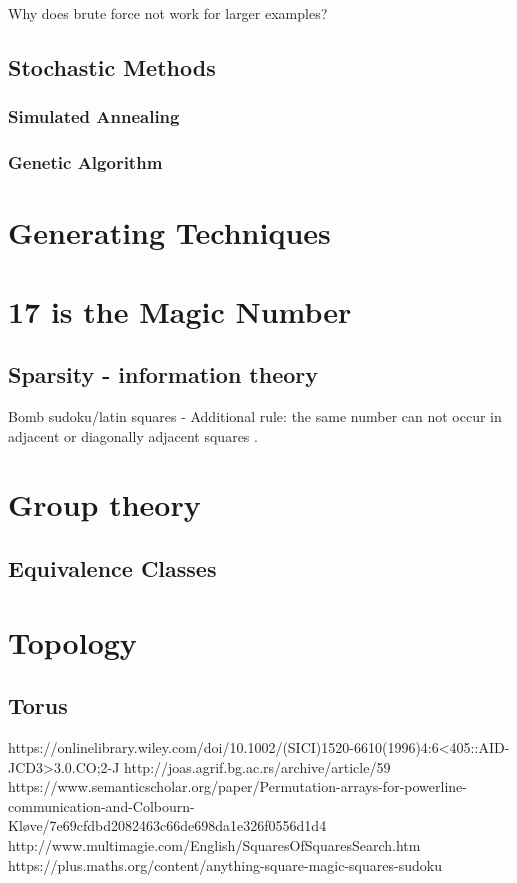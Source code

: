 \documentclass[a4paper,12pt]{article}
\begin{document}
		Why does brute force not work for larger examples?

	\subsection{Stochastic Methods}
		\subsubsection{Simulated Annealing}
		\subsubsection{Genetic Algorithm}
\section{Generating  Techniques}
\section{17 is the Magic Number}
	\subsection{Sparsity - information theory}
		Bomb sudoku/latin squares - Additional rule: the same number can not occur in adjacent or diagonally adjacent squares .
\section{Group theory}
	\subsection{Equivalence Classes}
\section{Topology}
	\subsection{Torus}

\begin{thebibliography}{100}
	 https://onlinelibrary.wiley.com/doi/10.1002/(SICI)1520-6610(1996)4:6<405::AID-JCD3>3.0.CO;2-J
	 http://joas.agrif.bg.ac.rs/archive/article/59
	 https://www.semanticscholar.org/paper/Permutation-arrays-for-powerline-communication-and-Colbourn-Kløve/7e69cfdbd2082463c66de698da1e326f0556d1d4
	 http://www.multimagie.com/English/SquaresOfSquaresSearch.htm
	 https://plus.maths.org/content/anything-square-magic-squares-sudoku
\end{thebibliography}
\end{document}
